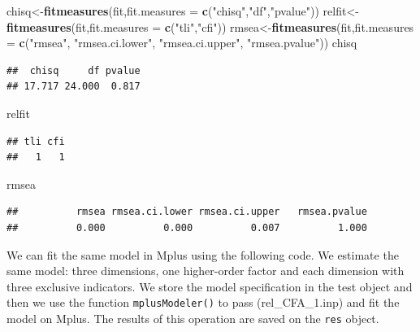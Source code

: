 \documentclass[]{book}
\newenvironment{Shaded}{\begin{snugshade}}{\end{snugshade}}
\newcommand{\DataTypeTok}[1]{\textcolor[rgb]{0.13,0.29,0.53}{#1}}
\newcommand{\KeywordTok}[1]{\textcolor[rgb]{0.13,0.29,0.53}{\textbf{#1}}}
\newcommand{\NormalTok}[1]{#1}
\newcommand{\StringTok}[1]{\textcolor[rgb]{0.31,0.60,0.02}{#1}}
\begin{document}
\begin{Shaded}
\begin{Highlighting}[]
\NormalTok{chisq<-}\KeywordTok{fitmeasures}\NormalTok{(fit,}\DataTypeTok{fit.measures =} \KeywordTok{c}\NormalTok{(}\StringTok{"chisq"}\NormalTok{,}\StringTok{"df"}\NormalTok{,}\StringTok{"pvalue"}\NormalTok{))}
\NormalTok{relfit<-}\KeywordTok{fitmeasures}\NormalTok{(fit,}\DataTypeTok{fit.measures =} \KeywordTok{c}\NormalTok{(}\StringTok{"tli"}\NormalTok{,}\StringTok{"cfi"}\NormalTok{))}
\NormalTok{rmsea<-}\KeywordTok{fitmeasures}\NormalTok{(fit,}\DataTypeTok{fit.measures =} \KeywordTok{c}\NormalTok{(}\StringTok{"rmsea"}\NormalTok{, }\StringTok{"rmsea.ci.lower"}\NormalTok{,}
                                        \StringTok{"rmsea.ci.upper"}\NormalTok{, }\StringTok{"rmsea.pvalue"}\NormalTok{))}
\NormalTok{chisq}
\end{Highlighting}
\end{Shaded}

\begin{verbatim}
##  chisq     df pvalue 
## 17.717 24.000  0.817
\end{verbatim}

\begin{Shaded}
\begin{Highlighting}[]
\NormalTok{relfit}
\end{Highlighting}
\end{Shaded}

\begin{verbatim}
## tli cfi 
##   1   1
\end{verbatim}

\begin{Shaded}
\begin{Highlighting}[]
\NormalTok{rmsea}
\end{Highlighting}
\end{Shaded}

\begin{verbatim}
##          rmsea rmsea.ci.lower rmsea.ci.upper   rmsea.pvalue 
##          0.000          0.000          0.007          1.000
\end{verbatim}

We can fit the same model in Mplus using the following code. We estimate the same model: three dimensions, one higher-order factor and each dimension with three exclusive indicators. We store the model specification in the test object and then we use the function \texttt{mplusModeler()} to pass (rel\_CFA\_1.inp) and fit the model on Mplus. The results of this operation are saved on the \texttt{res} object.
\end{document}
